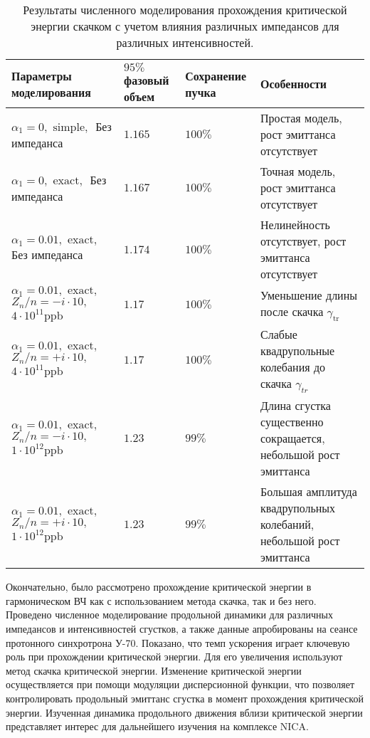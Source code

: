 \begin{table}
\begin{center}
\begin{tabular}{| m{4cm} | M{2.5cm} | M{2.5cm} | m{6.6cm} |}
\hline 
Параметры моделирования & $95 \%$ фазовый объем & Сохранение пучка & Особенности \\
\hline
$ \alpha_1=0, \text { simple, } $ Без импеданса
 & $1.165$ & $100\%$ &
Простая модель, рост эмиттанса отсутствует \\
\hline
$ \alpha_1=0, \text { exact, } $ Без импеданса
 & $1.167$ & $100\%$ & 
Точная модель, рост эмиттанса отсутствует  \\
\hline
$ \alpha_1=0.01, \text { exact, }$ Без импеданса
 & $1.174$ & $100\%$ & Нелинейность отсутствует, рост эмиттанса отсутствует \\
\hline 
$ \alpha_1=0.01, \text { exact, } $
$ Z_n / n=-i \cdot 10, \quad $
$ 4 \cdot 10^{11} \mathrm{ppb} $
 & $1.17$ & $100\%$ & Уменьшение длины после скачка $\gamma_{\text {tr }}$ \\
\hline 
$ \alpha_1=0.01, \text { exact, } $
$ Z_n / n=+i \cdot 10, \quad $
$ 4 \cdot 10^{11} \mathrm{ppb} $
 & $1.17$ & $100\%$ & Слабые квадрупольные колебания до скачка $\gamma_{t r}$ \\
\hline
$ \alpha_1=0.01, \text { exact, } $
$ Z_n / n=-i \cdot 10, \quad$
$ 1 \cdot 10^{12} \mathrm{ppb} $
 & $1.23$ & $99\%$ & Длина сгустка существенно сокращается, небольшой рост эмиттанса \\
\hline
$ \alpha_1=0.01, \text { exact, } $
$ Z_n / n=+i \cdot 10, \quad$
$ 1 \cdot 10^{12} \mathrm{ppb} $
 & $1.23$ & $99\%$ & Большая амплитуда квадрупольных колебаний, небольшой рост эмиттанса \\
\hline
\end{tabular}
\end{center}
\caption{Результаты численного моделирования прохождения критической энергии скачком с учетом влияния различных импедансов для различных интенсивностей.}
\label{tab:u-70_model}
\end{table}

\par Окончательно, было рассмотрено прохождение критической энергии в гармоническом ВЧ как с использованием метода скачка, так и без него. Проведено численное моделирование продольной динамики для различных импедансов и интенсивностей сгустков, а также данные апробированы на сеансе протонного синхротрона У-70. Показано, что темп ускорения играет ключевую роль при прохождении критической энергии. Для его увеличения используют метод скачка критической энергии. Изменение критической энергии осуществляется при помощи модуляции дисперсионной функции, что позволяет контролировать продольный эмиттанс сгустка в момент прохождения критической энергии. Изученная динамика продольного движения вблизи критической энергии представляет интерес для дальнейшего изучения на комплексе NICA.

